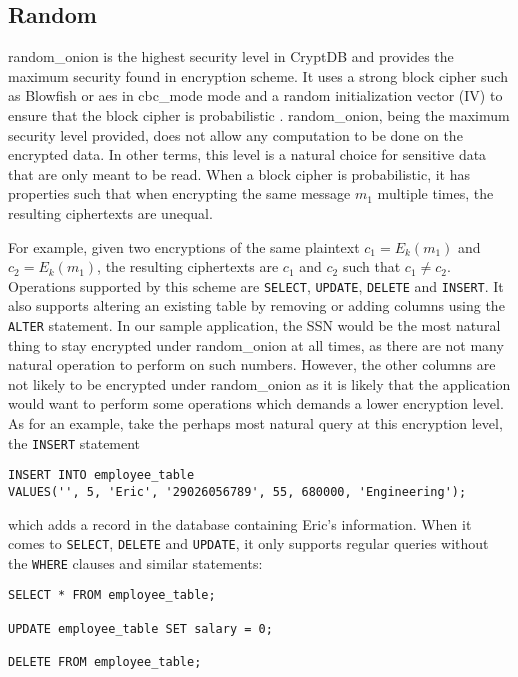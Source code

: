 \subsection{Random}
\Gls{random_onion} is the highest security level in CryptDB and provides the maximum security found in encryption scheme. It uses a strong block cipher such as Blowfish or \Gls{aes} in \Gls{cbc_mode} mode and a random initialization vector (IV) to ensure that the block cipher is probabilistic \citep{CryptDB_Main_Paper}. \Gls{random_onion}, being the maximum security level provided, does not allow any computation to be done on the encrypted data. In other terms, this level is a natural choice for sensitive data that are only meant to be read. When a block cipher is probabilistic, it has properties such that when encrypting the same message $m_1$ multiple times, the resulting ciphertexts are unequal. 

For example, given two encryptions of the same plaintext $c_1 = E_k(m_1)$ and $c_2 = E_k(m_1)$, the resulting ciphertexts are $c_1$ and $c_2$ such that $c_1 \neq c_2$. Operations supported by this scheme are \verb!SELECT!, \verb!UPDATE!, \verb!DELETE! and \verb!INSERT!. It also supports altering an existing table by removing or adding columns using the \verb!ALTER! statement. In our sample application, the SSN would be the most natural thing to stay encrypted under \gls{random_onion} at all times, as there are not many natural operation to perform on such numbers. However, the other columns are not likely to be encrypted under \gls{random_onion} as it is likely that the application would want to perform some operations which demands a lower encryption level. As for an example, take the perhaps most natural query at this encryption level, the \verb!INSERT! statement

\begin{verbatim}
INSERT INTO employee_table
VALUES('', 5, 'Eric', '29026056789', 55, 680000, 'Engineering');
\end{verbatim}

\noindent
which adds a record in the database containing Eric's information. When it comes to \verb!SELECT!, \verb!DELETE! and \verb!UPDATE!, it only supports regular queries without the \verb!WHERE! clauses and similar statements:

\begin{verbatim}
SELECT * FROM employee_table;

UPDATE employee_table SET salary = 0;

DELETE FROM employee_table;
\end{verbatim}


